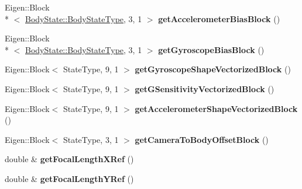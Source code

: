 \begin{DoxyCompactItemize}
\item 
\hypertarget{class_filter_state_a641cf74718074f9334fc88ac9d15169a}{Eigen\-::\-Block\\*
$<$ \hyperlink{class_body_state_ac95355c4974335a6f69da770d2de30e0}{Body\-State\-::\-Body\-State\-Type}, 3, 1 $>$ {\bfseries get\-Accelerometer\-Bias\-Block} ()}\label{class_filter_state_a641cf74718074f9334fc88ac9d15169a}

\item 
\hypertarget{class_filter_state_a94139185d217749e5afe23e6ad79bb12}{Eigen\-::\-Block\\*
$<$ \hyperlink{class_body_state_ac95355c4974335a6f69da770d2de30e0}{Body\-State\-::\-Body\-State\-Type}, 3, 1 $>$ {\bfseries get\-Gyroscope\-Bias\-Block} ()}\label{class_filter_state_a94139185d217749e5afe23e6ad79bb12}

\item 
\hypertarget{class_filter_state_a8686bb8e54e2e9902c28095f8c623745}{Eigen\-::\-Block$<$ State\-Type, 9, 1 $>$ {\bfseries get\-Gyroscope\-Shape\-Vectorized\-Block} ()}\label{class_filter_state_a8686bb8e54e2e9902c28095f8c623745}

\item 
\hypertarget{class_filter_state_a1ab46a729807178faf9b6bebb87aa791}{Eigen\-::\-Block$<$ State\-Type, 9, 1 $>$ {\bfseries get\-G\-Sensitivity\-Vectorized\-Block} ()}\label{class_filter_state_a1ab46a729807178faf9b6bebb87aa791}

\item 
\hypertarget{class_filter_state_a57cb64b2b25132c2da38b0313da415c5}{Eigen\-::\-Block$<$ State\-Type, 9, 1 $>$ {\bfseries get\-Accelerometer\-Shape\-Vectorized\-Block} ()}\label{class_filter_state_a57cb64b2b25132c2da38b0313da415c5}

\item 
\hypertarget{class_filter_state_a844855f0fa5ebf0c606a06ea6fdb460b}{Eigen\-::\-Block$<$ State\-Type, 3, 1 $>$ {\bfseries get\-Camera\-To\-Body\-Offset\-Block} ()}\label{class_filter_state_a844855f0fa5ebf0c606a06ea6fdb460b}

\item 
\hypertarget{class_filter_state_a3b65a9649366c853ffd99784fe9bef72}{double \& {\bfseries get\-Focal\-Length\-X\-Ref} ()}\label{class_filter_state_a3b65a9649366c853ffd99784fe9bef72}

\item 
\hypertarget{class_filter_state_aed71d6cec7d8a101ba10b83f969d28d4}{double \& {\bfseries get\-Focal\-Length\-Y\-Ref} ()}\label{class_filter_state_aed71d6cec7d8a101ba10b83f969d28d4}


\end{DoxyCompactItemize}
